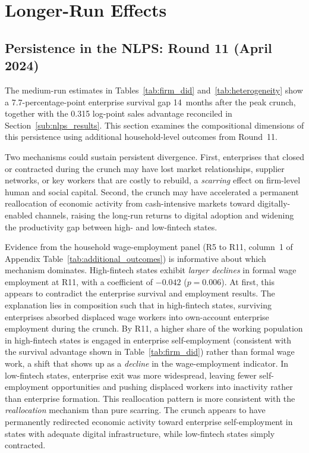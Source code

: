 
\section{Longer-Run Effects}
\label{sec:longrun}

\subsection{Persistence in the NLPS: Round 11 (April 2024)}

The medium-run estimates in Tables~\ref{tab:firm_did}
and~\ref{tab:heterogeneity} show a 7.7-percentage-point enterprise survival
gap 14~months after the peak crunch, together with the 0.315 log-point sales
advantage reconciled in Section~\ref{sub:nlps_results}. This section examines
the compositional dimensions of this persistence using additional
household-level outcomes from Round~11.

Two mechanisms could sustain persistent divergence. First, enterprises that
closed or contracted during the crunch may have lost market relationships,
supplier networks, or key workers that are costly to rebuild, a \emph{scarring}
effect on firm-level human and social capital. Second, the crunch may have
accelerated a permanent reallocation of economic activity from cash-intensive
markets toward digitally-enabled channels, raising the long-run returns to
digital adoption and widening the productivity gap between high- and
low-fintech states.

Evidence from the household wage-employment panel (R5 to R11, column~1 of
Appendix Table~\ref{tab:additional_outcomes}) is informative about which
mechanism dominates. High-fintech states exhibit \emph{larger declines} in
formal wage employment at R11, with a coefficient of $-0.042$ ($p = 0.006$).
At first, this appears to contradict the enterprise survival and
employment results. The explanation lies in composition such that in high-fintech states,
surviving enterprises absorbed displaced wage workers into own-account
enterprise employment during the crunch. By R11, a higher share of the working
population in high-fintech states is engaged in enterprise self-employment
(consistent with the survival advantage shown in Table~\ref{tab:firm_did})
rather than formal wage work, a shift that shows up as a \emph{decline} in
the wage-employment indicator. In low-fintech states, enterprise exit was more
widespread, leaving fewer self-employment opportunities and pushing displaced
workers into inactivity rather than enterprise formation. This reallocation
pattern is more consistent with the \emph{reallocation} mechanism than pure
scarring. The crunch appears to have permanently redirected economic activity
toward enterprise self-employment in states with adequate digital
infrastructure, while low-fintech states simply contracted.

